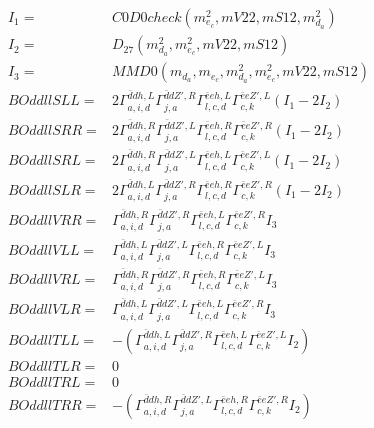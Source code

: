 \documentclass[A4,landscape]{article}
\begin{document}
\begin{align} 
I_1 = & C0D0check(m^2_{e_{{c}}}, mV22, mS12, m^2_{d_{{a}}}) \\ 
I_2 = & D_{27}(m^2_{d_{{a}}}, m^2_{e_{{c}}}, mV22, mS12) \\ 
I_3 = & MMD0(m_{d_{{a}}}, m_{e_{{c}}}, m^2_{d_{{a}}}, m^2_{e_{{c}}}, mV22, mS12) \\ 
  BOddllSLL= & 2  \Gamma^{\bar{d}d h ,L}_{a, i, d} \Gamma^{\bar{d}d {Z'} ,R}_{j, a} \Gamma^{\bar{e}e h ,L}_{l, c, d} \Gamma^{\bar{e}e {Z'} ,L}_{c, k} (I_1 - 2 I_2) \\ 
  BOddllSRR= & 2  \Gamma^{\bar{d}d h ,R}_{a, i, d} \Gamma^{\bar{d}d {Z'} ,L}_{j, a} \Gamma^{\bar{e}e h ,R}_{l, c, d} \Gamma^{\bar{e}e {Z'} ,R}_{c, k} (I_1 - 2 I_2) \\ 
  BOddllSRL= & 2  \Gamma^{\bar{d}d h ,R}_{a, i, d} \Gamma^{\bar{d}d {Z'} ,L}_{j, a} \Gamma^{\bar{e}e h ,L}_{l, c, d} \Gamma^{\bar{e}e {Z'} ,L}_{c, k} (I_1 - 2 I_2) \\ 
  BOddllSLR= & 2  \Gamma^{\bar{d}d h ,L}_{a, i, d} \Gamma^{\bar{d}d {Z'} ,R}_{j, a} \Gamma^{\bar{e}e h ,R}_{l, c, d} \Gamma^{\bar{e}e {Z'} ,R}_{c, k} (I_1 - 2 I_2) \\ 
  BOddllVRR= &  \Gamma^{\bar{d}d h ,R}_{a, i, d} \Gamma^{\bar{d}d {Z'} ,R}_{j, a} \Gamma^{\bar{e}e h ,L}_{l, c, d} \Gamma^{\bar{e}e {Z'} ,R}_{c, k} I_3 \\ 
  BOddllVLL= &  \Gamma^{\bar{d}d h ,L}_{a, i, d} \Gamma^{\bar{d}d {Z'} ,L}_{j, a} \Gamma^{\bar{e}e h ,R}_{l, c, d} \Gamma^{\bar{e}e {Z'} ,L}_{c, k} I_3 \\ 
  BOddllVRL= &  \Gamma^{\bar{d}d h ,R}_{a, i, d} \Gamma^{\bar{d}d {Z'} ,R}_{j, a} \Gamma^{\bar{e}e h ,R}_{l, c, d} \Gamma^{\bar{e}e {Z'} ,L}_{c, k} I_3 \\ 
  BOddllVLR= &  \Gamma^{\bar{d}d h ,L}_{a, i, d} \Gamma^{\bar{d}d {Z'} ,L}_{j, a} \Gamma^{\bar{e}e h ,L}_{l, c, d} \Gamma^{\bar{e}e {Z'} ,R}_{c, k} I_3 \\ 
  BOddllTLL= & -( \Gamma^{\bar{d}d h ,L}_{a, i, d} \Gamma^{\bar{d}d {Z'} ,R}_{j, a} \Gamma^{\bar{e}e h ,L}_{l, c, d} \Gamma^{\bar{e}e {Z'} ,L}_{c, k} I_2) \\ 
  BOddllTLR= & 0 \\ 
  BOddllTRL= & 0 \\ 
  BOddllTRR= & -( \Gamma^{\bar{d}d h ,R}_{a, i, d} \Gamma^{\bar{d}d {Z'} ,L}_{j, a} \Gamma^{\bar{e}e h ,R}_{l, c, d} \Gamma^{\bar{e}e {Z'} ,R}_{c, k} I_2) \\ 
\end{align} 
\end{document}

